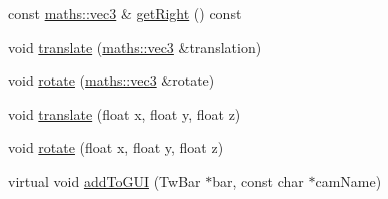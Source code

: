 \begin{DoxyCompactItemize}
\item 
const \hyperlink{structspork_1_1maths_1_1vec3}{maths\+::vec3} \& \hyperlink{classspork_1_1graphics_1_1_camera_a46f5ae89d30d350d782cdd694608a2a9}{get\+Right} () const
\item 
void \hyperlink{classspork_1_1graphics_1_1_camera_a586d097dca122dd99832884c284aa3a5}{translate} (\hyperlink{structspork_1_1maths_1_1vec3}{maths\+::vec3} \&translation)
\item 
void \hyperlink{classspork_1_1graphics_1_1_camera_ac7d6bdfc0d901c00f7f9be43efd248f5}{rotate} (\hyperlink{structspork_1_1maths_1_1vec3}{maths\+::vec3} \&rotate)
\item 
void \hyperlink{classspork_1_1graphics_1_1_camera_af23c57eff5b25116067efa45cccbdd9e}{translate} (float x, float y, float z)
\item 
void \hyperlink{classspork_1_1graphics_1_1_camera_a3af9d3dfc124d89dfbc85b1e1c06aafc}{rotate} (float x, float y, float z)
\item 
virtual void \hyperlink{classspork_1_1graphics_1_1_camera_a5ec54ffdedf82db7e3790566bd1e3522}{add\+To\+G\+UI} (Tw\+Bar $\ast$bar, const char $\ast$cam\+Name)
\end{DoxyCompactItemize}
